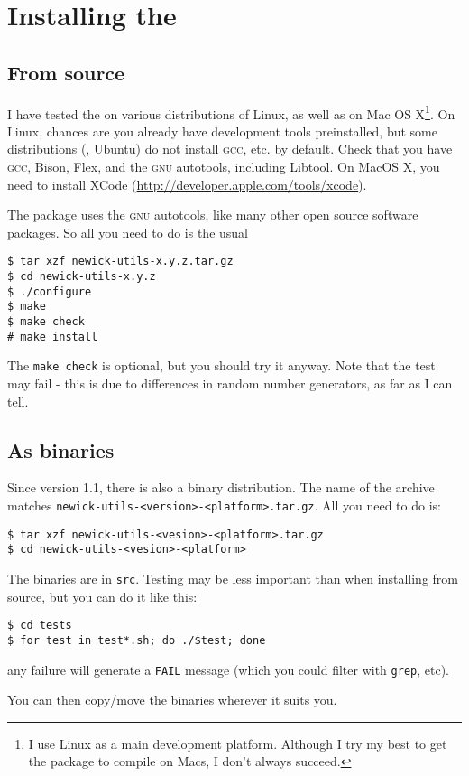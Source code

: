 \chapter{Installing the \nutils}

\section{From source}

I have tested the \nutils{} on various distributions of Linux, as well as on
Mac OS X\footnote{I use Linux as a main development platform. Although I try my
best to get the package to compile on Macs, I don't always succeed.}. On Linux,
chances are you already have development tools preinstalled, but some
distributions (\eg, Ubuntu) do not install \textsc{gcc}, etc. by default. Check
that you have \textsc{gcc}, Bison, Flex, and the \textsc{gnu} autotools,
including Libtool. On MacOS X, you need to install XCode
(\url{http://developer.apple.com/tools/xcode}).

The package uses the \textsc{gnu} autotools, like many other open source
software packages. So all you need to do is the usual
\begin{verbatim}
$ tar xzf newick-utils-x.y.z.tar.gz
$ cd newick-utils-x.y.z
$ ./configure
$ make
$ make check
# make install
\end{verbatim}
The \texttt{make check} is optional, but you should try it anyway. Note that
the \gen{} test may fail - this is due to differences in random number
generators, as far as I can tell.


\section{As binaries}

Since version 1.1, there is also a binary distribution. The name of the archive
matches \texttt{newick-utils-<version>-<platform>.tar.gz}. All you need to do is:

\begin{verbatim}
$ tar xzf newick-utils-<vesion>-<platform>.tar.gz
$ cd newick-utils-<vesion>-<platform>
\end{verbatim}

\noindent{}The binaries are in \texttt{src}. Testing may be less important than
when installing from source, but you can do it like this:

\begin{verbatim}
$ cd tests
$ for test in test*.sh; do ./$test; done 
\end{verbatim}

\noindent{}any failure will generate a \texttt{FAIL} message (which you could filter with \texttt{grep}, etc).

You can then copy/move the binaries wherever it suits you.

